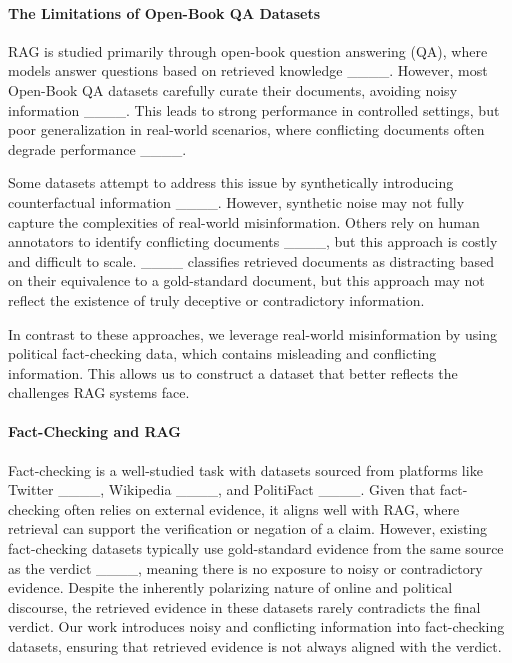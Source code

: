 \paragraph{The Limitations of Open-Book QA Datasets}
RAG is studied primarily through open-book question answering (QA), where models answer questions based on retrieved knowledge ____. However, most Open-Book QA datasets carefully curate their documents, avoiding noisy information ____. This leads to strong performance in controlled settings, but poor generalization in real-world scenarios, where conflicting documents often degrade performance ____.

Some datasets attempt to address this issue by synthetically introducing counterfactual information ____. However, synthetic noise may not fully capture the complexities of real-world misinformation. Others rely on human annotators to identify conflicting documents ____, but this approach is costly and difficult to scale. %
____ classifies retrieved documents as distracting based on their equivalence to a gold-standard document, but this approach may not reflect the existence of truly deceptive or contradictory information.

In contrast to these approaches, we leverage real-world misinformation by using political fact-checking data, which contains misleading and conflicting information. This allows us to construct a dataset that better reflects the challenges RAG systems face.

\paragraph{Fact-Checking and RAG}
Fact-checking is a well-studied task with datasets sourced from platforms like Twitter ____, Wikipedia ____, and PolitiFact ____. Given that fact-checking often relies on external evidence, it aligns well with RAG, where retrieval can support the verification or negation of a claim. However, existing fact-checking datasets typically use gold-standard evidence from the same source as the verdict ____, meaning there is no exposure to noisy or contradictory evidence. Despite the inherently polarizing nature of online and political discourse, the retrieved evidence in these datasets rarely contradicts the final verdict. Our work introduces noisy and conflicting information into fact-checking datasets, ensuring that retrieved evidence is not always aligned with the verdict.